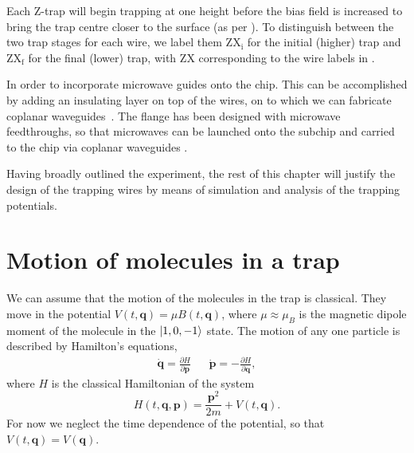 Each Z-trap will begin trapping at one height before the bias field is
increased to bring the trap centre closer to the surface (as per
).  To distinguish between the two trap stages for
each wire, we label them $\mathrm{ZX_i}$ for the initial (higher) trap and
$\mathrm{ZX_f}$ for the final (lower) trap, with $\mathrm{ZX}$ corresponding to
the wire labels in .

In order to incorporate microwave guides onto the chip. This can be
accomplished by adding an insulating layer on top of the wires, on to which we
can fabricate coplanar waveguides~\cite{1127105}. The flange has been designed
with microwave feedthroughs, so that microwaves can be launched onto the
subchip and carried to the chip via coplanar waveguides .

Having broadly outlined the experiment, the rest of this chapter will justify
the design of the trapping wires by means of simulation and analysis
of the trapping potentials.

\section{Motion of molecules in a trap}
\label{design:motion}

We can assume that the motion of the molecules in the trap is classical. They
move in the potential $V(t, \mathbf{q}) = \mu B(t, \mathbf{q})$, where
$\mu\approx\mu_B$ is the magnetic dipole moment of the molecule in the
$\ket{1,0,-1}$ state.  The motion of any one particle is described by Hamilton's
equations,~\cite{Lichtenberg1969}
%
\begin{align}
  \label{design:eq:hamilton}
  \dot{\mathbf{q}} =  \frac{\partial H}{\partial \mathbf{p}} &&
  \dot{\mathbf{p}} = -\frac{\partial H}{\partial \mathbf{q}},
\end{align}
%
where $H$ is the classical Hamiltonian of the system
\begin{equation}
  H(t, \mathbf{q}, \mathbf{p}) = \frac{\mathbf{p}^2}{2m} + V(t, \mathbf{q}).
\end{equation}
For now we neglect the time dependence of the potential, so that $V(t,
\mathbf{q}) = V(\mathbf{q})$.

